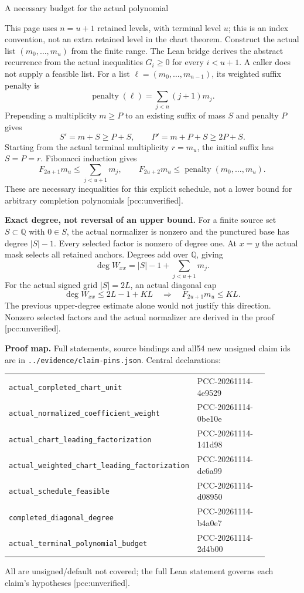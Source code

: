 \documentclass[10pt]{article}
\begin{document}
\newpage
\begin{center}{\Large A necessary budget for the actual polynomial}\end{center}
This page uses $n=u+1$ retained levels, with terminal level $u$; this is an
index convention, not an extra retained level in the chart theorem.
Construct the actual list $(m_0,\ldots,m_u)$ from the finite range. The
Lean bridge derives the abstract recurrence from the actual inequalities
$G_i\ge0$ for every $i<u+1$. A caller does not supply a feasible list.
For a list $\ell=(m_0,\ldots,m_{n-1})$, its weighted suffix penalty is
\[
 \operatorname{penalty}(\ell)=\sum_{j<n}(j+1)m_j.
\]
Prepending a multiplicity $m\ge P$ to an existing suffix of mass $S$ and
penalty $P$ gives
\[
 S'=m+S\ge P+S,\qquad P'=m+P+S\ge2P+S.
\]
Starting from the actual terminal multiplicity $r=m_u$, the initial suffix
has $S=P=r$. Fibonacci induction gives
\[
 F_{2u+1}m_u\le\sum_{j<u+1}m_j,\qquad
 F_{2u+2}m_u\le\operatorname{penalty}(m_0,\ldots,m_u).
\]
These are necessary inequalities for this explicit schedule, not a
lower bound for arbitrary completion polynomials [pcc:unverified].

\textbf{Exact degree, not reversal of an upper bound.}
For a finite source set $S\subset\mathbb Q$ with $0\in S$, the actual
normalizer is nonzero and the punctured base has degree $|S|-1$.
Every selected factor is nonzero of degree one. At $x=y$ the actual mask
selects all retained anchors. Degrees add over $\mathbb Q$, giving
\[
 \deg W_{xx}=|S|-1+\sum_{j<u+1}m_j.
\]
For the actual signed grid $|S|=2L$, an actual diagonal cap
\[
 \deg W_{xx}\le 2L-1+KL
 \quad\Longrightarrow\quad F_{2u+1}m_u\le KL.
\]
The previous upper-degree estimate alone would not justify this direction.
Nonzero selected factors and the actual normalizer are derived in the proof
[pcc:unverified].

\textbf{Proof map.} Full statements, source bindings and all54 new unsigned
claim ids are in \texttt{../evidence/claim-pins.json}. Central declarations:
\begin{center}\small
\begin{tabular}{p{0.59\linewidth}p{0.29\linewidth}}
\texttt{actual\_completed\_chart\_unit} & PCC-20261114-4e9529\\
\texttt{actual\_normalized\_coefficient\_weight} & PCC-20261114-0be10e\\
\texttt{actual\_chart\_leading\_factorization} & PCC-20261114-141d98\\
\texttt{actual\_weighted\_chart\_leading\_factorization} & PCC-20261114-dc6a99\\
\texttt{actual\_schedule\_feasible} & PCC-20261114-d08950\\
\texttt{completed\_diagonal\_degree} & PCC-20261114-b4a0e7\\
\texttt{actual\_terminal\_polynomial\_budget} & PCC-20261114-2d4b00
\end{tabular}
\end{center}
All are unsigned/default not covered; the full Lean statement governs each
claim's hypotheses [pcc:unverified].
\end{document}
